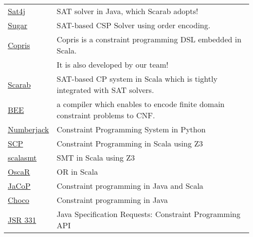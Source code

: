 \documentclass[11pt]{article}
\begin{document}
\begin{center}
\begin{tabular}{ll}
\href{http://www.sat4j.org}{Sat4j} & SAT solver in Java, which Scarab adopts!\\
\href{http://bach.istc.kobe-u.ac.jp/sugar/}{Sugar} & SAT-based CSP Solver using order encoding.\\
\href{http://bach.istc.kobe-u.ac.jp/copris/}{Copris} & Copris is a constraint programming DSL embedded in Scala.\\
 & It is also developed by our team!\\
\href{http://kix.istc.kobe-u.ac.jp/~soh/scarab/}{Scarab} & SAT-based CP system in Scala which is tightly integrated with SAT solvers.\\
\href{http://amit.metodi.me/research/bee/}{BEE} & a compiler which enables to encode finite domain constraint problems to CNF.\\
\href{http://numberjack.ucc.ie}{Numberjack} & Constraint Programming System in Python\\
\href{http://lara.epfl.ch/web2010/scp}{SCP} & Constraint Programming in Scala using Z3\\
\href{http://code.google.com/p/scalasmt/}{scalasmt} & SMT in Scala using Z3\\
\href{https://bitbucket.org/oscarlib/oscar}{OscaR} & OR in Scala\\
\href{http://jacop.osolpro.com/}{JaCoP} & Constraint programming in Java and Scala\\
\href{http://www.emn.fr/x-info/choco-solver/}{Choco} & Constraint programming in Java\\
\href{http://jcp.org/en/jsr/detail?id\%3D331}{JSR 331} & Java Specification Requests: Constraint Programming API\\
\end{tabular}
\end{center}
\end{document}
